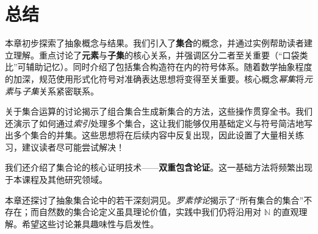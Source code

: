 \section{总结}

本章初步探索了抽象概念与结果。我们引入了\textbf{集合}的概念，并通过实例帮助读者建立理解。重点讨论了\textbf{元素}与\textbf{子集}的核心关系，并强调区分二者至关重要（``口袋类比''可辅助记忆）。同时介绍了包括集合构造符在内的符号体系。随着数学抽象程度的加深，规范使用形式化符号对准确表达思想将变得至关重要。核心概念\emph{幂集}将\emph{元素}与\emph{子集}关系紧密联系。

关于集合运算的讨论揭示了组合集合生成新集合的方法，这些操作贯穿全书。我们还演示了如何通过\emph{索引}处理多个集合，这让我们能够仅用基础定义与符号简洁地写出多个集合的并集。这些思想将在后续内容中反复出现，因此设置了大量相关练习，建议读者尽可能尝试解决！

我们还介绍了集合论的核心证明技术——\textbf{双重包含论证}。这一基础方法将频繁出现于本课程及其他研究领域。

本章还探讨了抽象集合论中的若干深刻洞见。\emph{罗素悖论}揭示了``所有集合的集合''不存在；而自然数的集合论定义虽具理论价值，实践中我们仍将沿用对 $\mathbb{N}$ 的直观理解。希望这些讨论兼具趣味性与启发性。

